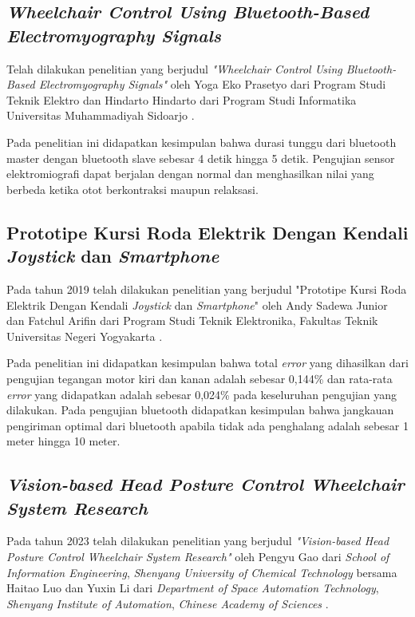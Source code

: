 \subsection{\emph{Wheelchair Control Using Bluetooth-Based Electromyography Signals}}

Telah dilakukan penelitian yang berjudul \emph{"Wheelchair Control Using Bluetooth-Based Electromyography Signals"} oleh Yoga Eko Prasetyo dari Program Studi Teknik Elektro dan Hindarto Hindarto dari Program Studi Informatika Universitas Muhammadiyah Sidoarjo \parencite{prasetyowheelchair}.

Pada penelitian ini didapatkan kesimpulan bahwa durasi tunggu dari bluetooth master dengan bluetooth slave sebesar 4 detik hingga 5 detik. Pengujian sensor elektromiografi dapat berjalan dengan normal dan menghasilkan nilai yang berbeda ketika otot berkontraksi maupun relaksasi. 

\subsection{Prototipe Kursi Roda Elektrik Dengan Kendali \emph{Joystick} dan \emph{Smartphone}}

Pada tahun 2019 telah dilakukan penelitian yang berjudul "Prototipe Kursi Roda Elektrik Dengan Kendali \emph{Joystick} dan \emph{Smartphone}" oleh Andy Sadewa Junior dan Fatchul Arifin dari Program Studi Teknik Elektronika, Fakultas Teknik Universitas Negeri Yogyakarta \parencite{junior2019prototipe}.

Pada penelitian ini didapatkan kesimpulan bahwa total \emph{error} yang dihasilkan dari pengujian tegangan motor kiri dan kanan adalah sebesar 0,144\% dan rata-rata \emph{error} yang didapatkan adalah sebesar 0,024\% pada keseluruhan pengujian yang dilakukan. Pada pengujian bluetooth didapatkan kesimpulan bahwa jangkauan pengiriman optimal dari bluetooth apabila tidak ada penghalang adalah sebesar 1 meter hingga 10 meter.

\subsection{\emph{Vision-based Head Posture Control Wheelchair System Research}}

Pada tahun 2023 telah dilakukan penelitian yang berjudul \emph{"Vision-based Head Posture Control Wheelchair System Research"} oleh Pengyu Gao dari \emph{School of Information Engineering}, \emph{Shenyang University of Chemical Technology} bersama Haitao Luo dan Yuxin Li dari \emph{Department of Space Automation Technology}, \emph{Shenyang Institute of Automation}, \emph{Chinese Academy of Sciences} \parencite{10280784}.

